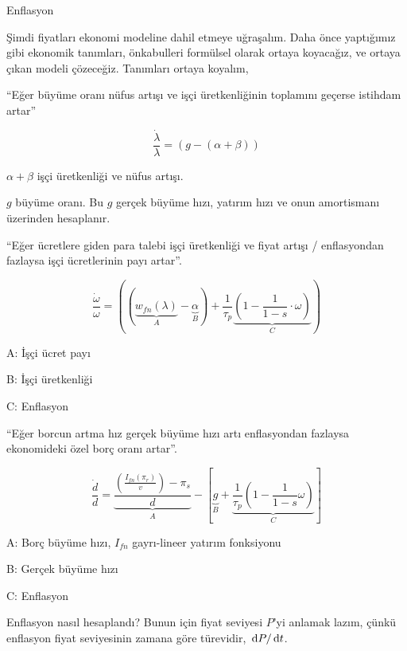 \documentclass[12pt,fleqn]{article}\usepackage{../../common}
\begin{document}
Enflasyon

Şimdi fiyatları ekonomi modeline dahil etmeye uğraşalım. Daha önce
yaptığımız gibi ekonomik tanımları, önkabulleri formülsel olarak ortaya
koyacağız, ve ortaya çıkan modeli çözeceğiz. Tanımları ortaya koyalım,


``Eğer büyüme oranı nüfus artışı ve işçi üretkenliğinin toplamını geçerse
istihdam artar'' 

$$ 
\frac{\dot{\lambda}}{\lambda} =
\left( 
   g -  (\alpha + \beta) 
\right)
$$

$\alpha + \beta$ işçi üretkenliği ve nüfus artışı.

$g$ büyüme oranı. Bu $g$ gerçek büyüme hızı, yatırım hızı ve onun
amortismanı üzerinden hesaplanır.


``Eğer ücretlere giden para talebi işçi üretkenliği ve fiyat artışı /
enflasyondan fazlaysa işçi ücretlerinin payı artar''.


$$ 
\frac{\dot{\omega}}{\omega} = 
\left( 
(\underbrace{w_{fn}(\lambda)}_{A} - \underbrace{\alpha}_{B}) + \frac{1}{\tau_p}
\underbrace{\left( 1-\frac{1}{1-s} \cdot \omega \right)}_{C}
\right)
$$


A: İşçi ücret payı %

B: İşçi üretkenliği %

C: Enflasyon %


``Eğer borcun artma hız gerçek büyüme hızı artı enflasyondan fazlaysa
ekonomideki özel borç oranı artar''. 

$$ 
\frac{\dot{d}}{d} = 
\underbrace{\frac{\left( \frac{I_{fn}(\pi_r)}{v} \right) - \pi_s }{d}}_{A} - 
\left[ 
\underbrace{g }_{B}+ 
\underbrace{\frac{1}{\tau_p} \left(1 - \frac{1}{1-s} \omega\right)}_{C}
\right]
$$

A: Borç büyüme hızı, $I_{fn}$ gayrı-lineer yatırım fonksiyonu  %

B: Gerçek büyüme hızı %

C: Enflasyon

Enflasyon nasıl hesaplandı? Bunun için fiyat seviyesi $P$'yi anlamak lazım,
çünkü enflasyon fiyat seviyesinin zamana göre türevidir, $\,\mathrm{d} P/\,\mathrm{d} t$.
\end{document}
